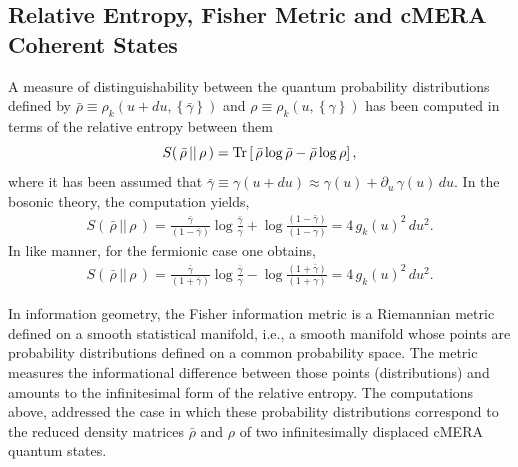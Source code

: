 \documentclass[preprint,aps]{revtex4}
\def\barray{\begin{eqnarray}}
\def\earray{\end{eqnarray}}
\def\beq{\begin{equation}}
\def\eeq{\end{equation}}
\begin{document}
\subsection*{Relative Entropy, Fisher Metric and cMERA Coherent States}
\label{relative_ent}
A measure of distinguishability between the quantum probability distributions defined by $\bar{\rho}\equiv\rho_k\left( u+du,\left\lbrace \bar{\gamma}\right\rbrace \right) $ and $\rho\equiv\rho_k\left( u,\left\lbrace \gamma\right\rbrace \right) $ has been computed in terms of the relative entropy between them \cite{vedral}
\beq
\label{eq2.14}
S(\, \bar{\rho}\, ||\, \rho\, )={\rm Tr}\left[\, \bar{\rho}\log\bar{\rho}-\bar{\rho}\log \rho \right], 
\eeq
where it has been assumed that $\bar{\gamma}\equiv \gamma(u+du)\approx \gamma(u)+ \partial_u\, \gamma(u)\, du$. In the bosonic theory, the computation yields,
\barray
\label{eq2.15}
S(\, \bar{\rho}\, ||\, \rho\, )  =  \frac{\bar{\gamma}}{(1-\bar{\gamma})}\log\frac{\bar{\gamma}}{\gamma} + \log\frac{(1-\bar{\gamma})}{(1-\gamma)}= 4\, g_k(u)^2\, du^2.
\earray
In like manner, for the fermionic case one obtains,
\barray
\label{eq2.16}
S(\, \bar{\rho}\, ||\, \rho\, )=  \frac{\bar{\gamma}}{(1+\bar{\gamma})}\log\frac{\bar{\gamma}}{\gamma} - \log\frac{(1+\bar{\gamma})}{(1+\gamma)}= 4\, g_k(u)^2\, du^2.
\earray

In information geometry, the Fisher information metric \cite{amari} is a Riemannian metric defined on a smooth statistical manifold, i.e., a smooth manifold whose points are probability distributions defined on a common probability space. The metric measures the informational difference between those points (distributions) and  amounts to the infinitesimal form of the relative entropy. The computations above, addressed the case in which these probability distributions correspond to the reduced density matrices $\bar{\rho}$ and $\rho$ of two infinitesimally displaced cMERA quantum states. 
\end{document}
